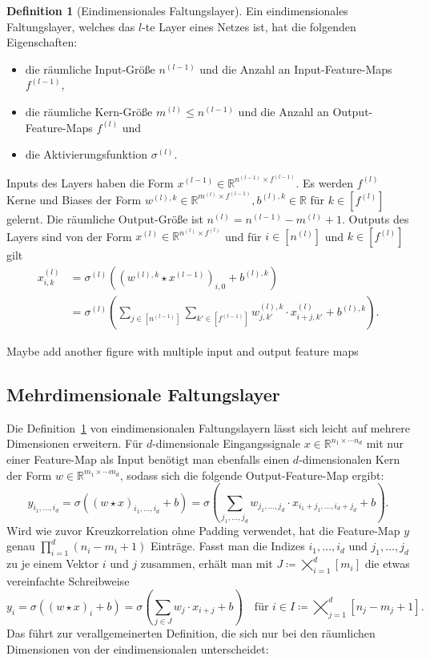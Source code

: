 \documentclass[paper=a4, 	%
		fontsize=11pt,
		abstract=true, 	%
		headsepline, 	%
		notitlepage	%
		]{scrartcl}
\theoremstyle{definition}
\newtheorem{definition}[theorem]{Definition}
\newcommand{\R}{\mathbb{R}}
\newcommand{\todo}[1]{{\color{red} #1}}
\newcommand{\fNat}[1]{[ #1 ]}
\begin{document}
\begin{definition}[Eindimensionales Faltungslayer]\label{def:one-dimensional-conv-layer}
    Ein eindimensionales Faltungslayer, welches das $l$-te Layer eines Netzes ist, hat die folgenden Eigenschaften:
    \begin{itemize}
        \item die räumliche Input-Größe $n^{(l-1)}$ und die Anzahl an Input-Feature-Maps $f^{(l-1)}$,
        \item die räumliche Kern-Größe $m^{(l)}\leq n^{(l-1)}$ und die Anzahl an Output-Feature-Maps $f^{(l)}$ und
        \item die Aktivierungsfunktion $\sigma^{(l)}$.
    \end{itemize}
    Inputs des Layers haben die Form $x^{(l-1)}\in\R^{n^{(l-1)} \times f^{(l-1)}}$.
    Es werden $f^{(l)}$ Kerne und Biases der Form $w^{(l),k}\in\R^{m^{(l)} \times f^{(l-1)}}, b^{(l),k}\in\R$ für  $k\in \fNat{f^{(l)}}$ gelernt.
    Die räumliche Output-Größe ist $n^{(l)} = n^{(l-1)}-  m^{(l)} + 1$.
    Outputs des Layers sind von der Form $x^{(l)}\in \R^{n^{(l)}\times f^{(l)}}$ und für $i\in\fNat{n^{(l)}}$ und $k\in\fNat{f^{(l)}}$ gilt
    \begin{align*}
        x^{(l)}_{i,k}
        &=  \sigma^{(l)}\left( (w^{(l),k} \star x^{(l-1)})_{i,0} + b^{(l),k} \right)\\
        &= \sigma^{(l)} \left( 
            \sum_{j \in \fNat{n^{(l-1)}}} \sum_{k'\in \fNat{f^{(l-1)}}}
            w^{(l),k}_{j,k'} \cdot x^{(l)}_{i+j, k'} + b^{(l), k}
        \right).
    \end{align*}
\end{definition}

\todo{Maybe add another figure with multiple input and output feature maps}

\subsection{Mehrdimensionale Faltungslayer}

Die Definition~\ref{def:one-dimensional-conv-layer} von eindimensionalen Faltungslayern lässt sich leicht auf mehrere Dimensionen erweitern.
Für $d$-dimensionale Eingangssignale $x\in\R^{n_1\times \cdots n_d}$ mit nur einer Feature-Map als Input benötigt man ebenfalls einen $d$-dimensionalen Kern der Form $w\in\R^{m_1\times\cdots m_d}$, sodass sich die folgende Output-Feature-Map ergibt:
\[
    y_{i_1,\dots,i_d} = \sigma\left((w\star x)_{i_1,\dots,i_d} + b\right)
    = \sigma\left( \sum_{j_1,\dots,j_d} w_{j_1,\dots,j_d} \cdot x_{i_1+j_1,\dots,i_d+j_d} + b \right).
\]
Wird wie zuvor Kreuzkorrelation ohne Padding verwendet, hat die Feature-Map $y$ genau $\prod_{i=1}^d (n_i - m_i +1)$ Einträge.
Fasst man die Indizes $i_1,\dots,i_d$ und $j_1,\dots,j_d$ zu je einem Vektor $i$ und $j$ zusammen, erhält man mit $J\coloneqq \bigtimes_{i=1}^d [m_i]$ die etwas vereinfachte Schreibweise
\[
    y_{i} = \sigma\left((w\star x)_{i} + b\right)
    = \sigma\left( \sum_{j \in J} w_j \cdot x_{i+j} + b \right) \quad \text{für $i\in I\coloneqq \bigtimes_{j=1}^d [n_j - m_j +1]$}.
\]
Das führt zur verallgemeinerten Definition, die sich nur bei den räumlichen Dimensionen von der eindimensionalen unterscheidet:
\end{document}
